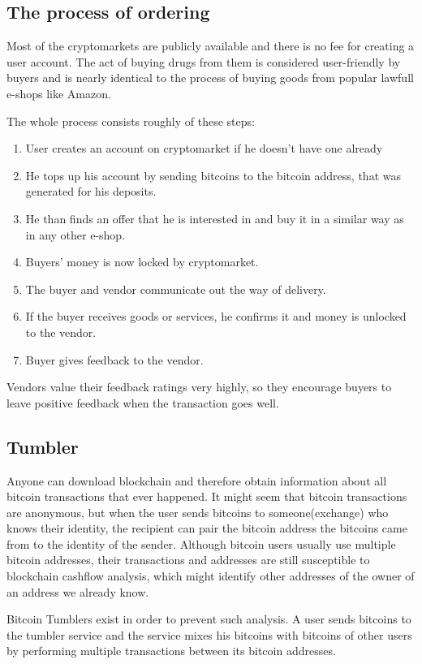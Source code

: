 \documentclass[
  digital, %
  table,   %
  lof,     %
  lot,     %
  oneside
]{fithesis3}
\begin{document}
\subsection{The process of ordering}
Most of the cryptomarkets are publicly available and there is no fee
for creating a user account. The act of buying drugs from them is considered user-friendly by buyers and is nearly identical to the process of buying goods from popular lawfull e-shops like Amazon.

 The whole process consists roughly of these steps:
\begin{enumerate}
\item User creates an account on cryptomarket if he doesn't have one already
\item He tops up his account by sending bitcoins to the bitcoin address,
that was generated for his deposits.
\item He than finds an offer that he is interested in and buy it in a similar
way as in any other e-shop.
\item Buyers' money is now locked by cryptomarket.
\item The buyer and vendor communicate out the way of delivery.
\item If the buyer receives goods or services, he confirms it and money is unlocked to the vendor.
\item Buyer gives feedback to the vendor. 
\end{enumerate}

Vendors value their feedback ratings very highly, so they encourage buyers to leave
 positive feedback when the transaction goes well.
 
\subsection{Tumbler}
Anyone can download blockchain and therefore obtain information about all bitcoin transactions that ever happened.
It might seem that bitcoin transactions are anonymous, but when the user sends bitcoins to
someone(exchange) who knows their identity, the recipient can pair the bitcoin address
the bitcoins came from to the identity of the sender.
Although bitcoin users usually use multiple bitcoin addresses,
their transactions and addresses are still 
susceptible to blockchain cashflow analysis,
which might identify other addresses of the owner of an address we already know.

Bitcoin Tumblers exist in order to prevent such analysis.
A user sends bitcoins to the tumbler service and the service mixes his bitcoins
with bitcoins of other users by performing multiple transactions
between its bitcoin addresses. \parencite{moser2013inquiry}
  
\end{document}
